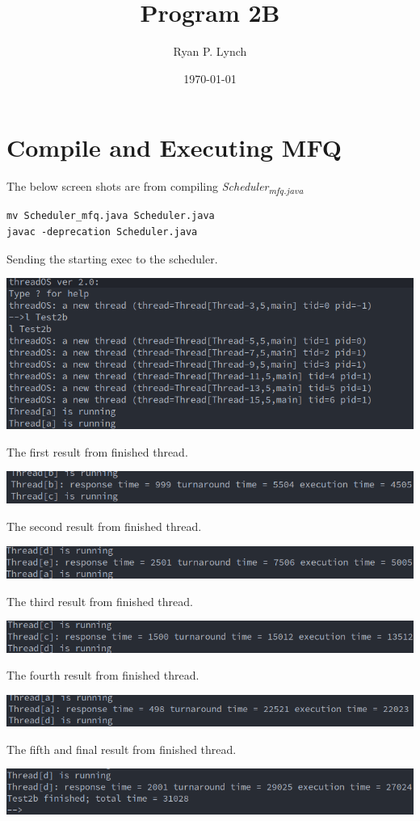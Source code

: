 \documentclass[a4paper,11pt,twoside]{article}
\author{Ryan P. Lynch}
\date{\today}
\title{Program 2B}
\begin{document}
\maketitle
\section*{Compile and Executing MFQ}
\label{sec:orgbd330cd}
The below screen shots are from compiling \emph{Scheduler\textsubscript{mfq.java}}
\begin{verbatim}
mv Scheduler_mfq.java Scheduler.java
javac -deprecation Scheduler.java
\end{verbatim}
Sending the starting exec to the scheduler.
\begin{center}
\includegraphics[width=.9\linewidth]{./mfq0.png}
\end{center}
The first result from finished thread.
\begin{center}
\includegraphics[width=.9\linewidth]{./mfq1.png}
\end{center}
The second result from finished thread.
\begin{center}
\includegraphics[width=.9\linewidth]{./mfq2.png}
\end{center}
The third result from finished thread.
\begin{center}
\includegraphics[width=.9\linewidth]{./mfq3.png}
\end{center}
The fourth result from finished thread.
\begin{center}
\includegraphics[width=.9\linewidth]{./mfq4.png}
\end{center}
The fifth and final result from finished thread.
\begin{center}
\includegraphics[width=.9\linewidth]{./mfq5.png}
\end{center}
\end{document}
